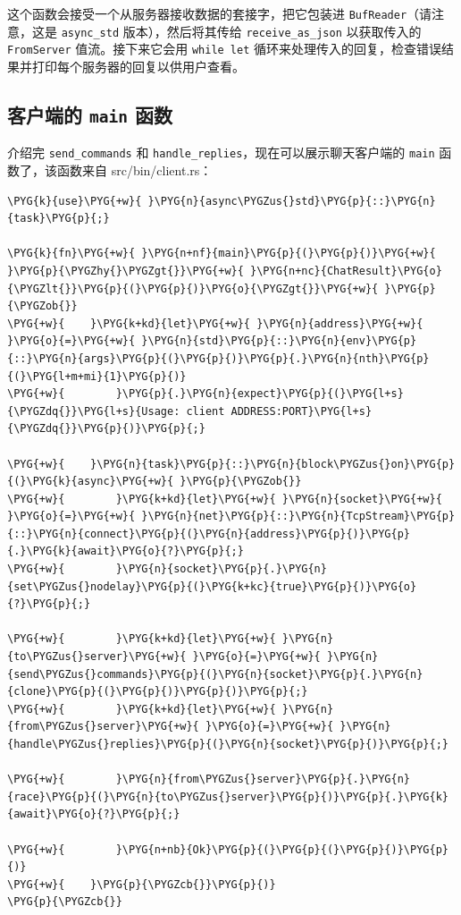 这个函数会接受一个从服务器接收数据的套接字，把它包装进 \texttt{BufReader}（请注意，这是 \texttt{async\_std} 版本），然后将其传给 \texttt{receive\_as\_json} 以获取传入的 \texttt{FromServer} 值流。接下来它会用 \texttt{while let} 循环来处理传入的回复，检查错误结果并打印每个服务器的回复以供用户查看。

\subsection{客户端的 \texttt{main} 函数}

介绍完 \texttt{send\_commands} 和 \texttt{handle\_replies}，现在可以展示聊天客户端的 \texttt{main} 函数了，该函数来自 src/bin/client.rs：

\begin{Verbatim}[commandchars=\\\{\},breaklines=true,breakanywhere=true,fontsize=\codefont,xleftmargin=17bp]
\PYG{k}{use}\PYG{+w}{ }\PYG{n}{async\PYGZus{}std}\PYG{p}{::}\PYG{n}{task}\PYG{p}{;}

\PYG{k}{fn}\PYG{+w}{ }\PYG{n+nf}{main}\PYG{p}{(}\PYG{p}{)}\PYG{+w}{ }\PYG{p}{\PYGZhy{}\PYGZgt{}}\PYG{+w}{ }\PYG{n+nc}{ChatResult}\PYG{o}{\PYGZlt{}}\PYG{p}{(}\PYG{p}{)}\PYG{o}{\PYGZgt{}}\PYG{+w}{ }\PYG{p}{\PYGZob{}}
\PYG{+w}{    }\PYG{k+kd}{let}\PYG{+w}{ }\PYG{n}{address}\PYG{+w}{ }\PYG{o}{=}\PYG{+w}{ }\PYG{n}{std}\PYG{p}{::}\PYG{n}{env}\PYG{p}{::}\PYG{n}{args}\PYG{p}{(}\PYG{p}{)}\PYG{p}{.}\PYG{n}{nth}\PYG{p}{(}\PYG{l+m+mi}{1}\PYG{p}{)}
\PYG{+w}{        }\PYG{p}{.}\PYG{n}{expect}\PYG{p}{(}\PYG{l+s}{\PYGZdq{}}\PYG{l+s}{Usage: client ADDRESS:PORT}\PYG{l+s}{\PYGZdq{}}\PYG{p}{)}\PYG{p}{;}

\PYG{+w}{    }\PYG{n}{task}\PYG{p}{::}\PYG{n}{block\PYGZus{}on}\PYG{p}{(}\PYG{k}{async}\PYG{+w}{ }\PYG{p}{\PYGZob{}}
\PYG{+w}{        }\PYG{k+kd}{let}\PYG{+w}{ }\PYG{n}{socket}\PYG{+w}{ }\PYG{o}{=}\PYG{+w}{ }\PYG{n}{net}\PYG{p}{::}\PYG{n}{TcpStream}\PYG{p}{::}\PYG{n}{connect}\PYG{p}{(}\PYG{n}{address}\PYG{p}{)}\PYG{p}{.}\PYG{k}{await}\PYG{o}{?}\PYG{p}{;}
\PYG{+w}{        }\PYG{n}{socket}\PYG{p}{.}\PYG{n}{set\PYGZus{}nodelay}\PYG{p}{(}\PYG{k+kc}{true}\PYG{p}{)}\PYG{o}{?}\PYG{p}{;}

\PYG{+w}{        }\PYG{k+kd}{let}\PYG{+w}{ }\PYG{n}{to\PYGZus{}server}\PYG{+w}{ }\PYG{o}{=}\PYG{+w}{ }\PYG{n}{send\PYGZus{}commands}\PYG{p}{(}\PYG{n}{socket}\PYG{p}{.}\PYG{n}{clone}\PYG{p}{(}\PYG{p}{)}\PYG{p}{)}\PYG{p}{;}
\PYG{+w}{        }\PYG{k+kd}{let}\PYG{+w}{ }\PYG{n}{from\PYGZus{}server}\PYG{+w}{ }\PYG{o}{=}\PYG{+w}{ }\PYG{n}{handle\PYGZus{}replies}\PYG{p}{(}\PYG{n}{socket}\PYG{p}{)}\PYG{p}{;}

\PYG{+w}{        }\PYG{n}{from\PYGZus{}server}\PYG{p}{.}\PYG{n}{race}\PYG{p}{(}\PYG{n}{to\PYGZus{}server}\PYG{p}{)}\PYG{p}{.}\PYG{k}{await}\PYG{o}{?}\PYG{p}{;}

\PYG{+w}{        }\PYG{n+nb}{Ok}\PYG{p}{(}\PYG{p}{(}\PYG{p}{)}\PYG{p}{)}
\PYG{+w}{    }\PYG{p}{\PYGZcb{}}\PYG{p}{)}
\PYG{p}{\PYGZcb{}}
\end{Verbatim}

